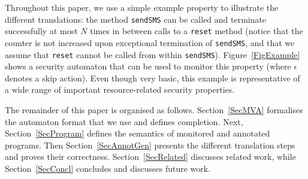 Throughout this paper, we use a simple example property to
illustrate the different translations: the method \texttt{sendSMS} can
be called and terminate successfully at most \(N\) times in between
calls to a \texttt{reset} method (notice that the counter is not
increased upon exceptional termination of
\texttt{sendSMS}, and that we assume that \texttt{reset} cannot be
called from within \texttt{sendSMS}). Figure~\ref{FigExample} shows a
security automaton that can be used to monitor this property (where
\(\epsilon\) denotes a skip action). Even though very basic,
this example is representative of a wide range of important
resource-related security properties.

The remainder of this paper is organised as follows.
Section~\ref{SecMVA} formalises the automaton format that we
use and defines completion. Next,
Section~\ref{SecProgram} defines the semantics of monitored and
annotated programs. Then Section~\ref{SecAnnotGen} presents the
different translation steps and proves their
correctness. Section~\ref{SecRelated} discusses related work, while
Section~\ref{SecConcl} concludes and discusses future work.
